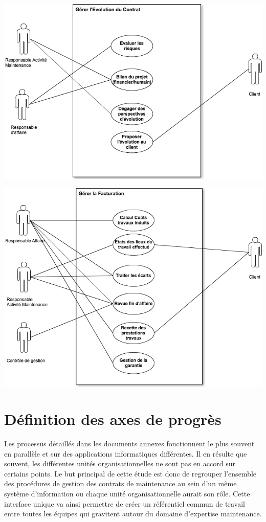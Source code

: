 \begin {center}
\includegraphics[width=\textwidth]{png/DCUGererEvolutionContrat.png}
\end {center}

\begin {center}
\includegraphics[width=\textwidth]{png/DCUGererFacturation.png}
\end {center}


\section{Définition des axes de progrès}

Les processus détaillés dans les documents annexes fonctionnent le plus souvent en parallèle et sur des applications informatiques différentes. Il en résulte que souvent, les différentes unités organisationnelles ne sont pas en accord sur certains points. Le but principal de cette étude est donc de regrouper l'ensemble des procédures de gestion des contrats de maintenance au sein d'un même système d'information ou chaque unité organisationnelle aurait son rôle. Cette interface unique va ainsi permettre de créer un référentiel commun de travail entre toutes les équipes qui gravitent autour du domaine d'expertise maintenance. 

